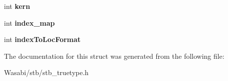 \begin{DoxyCompactItemize}
\item 
int {\bfseries kern}\hypertarget{structstbtt__fontinfo_a57cc83512daea60e97ed49354d634d37}{}\label{structstbtt__fontinfo_a57cc83512daea60e97ed49354d634d37}

\item 
int {\bfseries index\+\_\+map}\hypertarget{structstbtt__fontinfo_a0b95e3ac0c397b72b7696ce6696eb189}{}\label{structstbtt__fontinfo_a0b95e3ac0c397b72b7696ce6696eb189}

\item 
int {\bfseries index\+To\+Loc\+Format}\hypertarget{structstbtt__fontinfo_a5fa117a7ef058111a70a5b0b87d220f4}{}\label{structstbtt__fontinfo_a5fa117a7ef058111a70a5b0b87d220f4}

\end{DoxyCompactItemize}


The documentation for this struct was generated from the following file\+:\begin{DoxyCompactItemize}
\item 
Wasabi/stb/stb\+\_\+truetype.\+h\end{DoxyCompactItemize}
